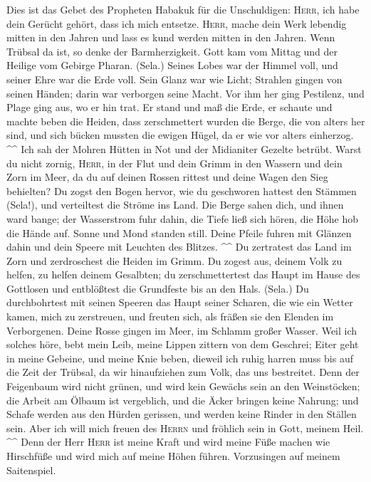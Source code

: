  Dies ist das Gebet des Propheten Habakuk für die
Unschuldigen:  \textsc{Herr}, ich habe dein Gerücht
gehört, dass ich mich entsetze. \textsc{Herr}, mache dein Werk lebendig
mitten in den Jahren und lass es kund werden mitten in den Jahren. Wenn
Trübsal da ist, so denke der Barmherzigkeit.  Gott kam vom
Mittag und der Heilige vom Gebirge Pharan. (Sela.) Seines Lobes war der
Himmel voll, und seiner Ehre war die Erde voll.  Sein
Glanz war wie Licht; Strahlen gingen von seinen Händen; darin war
verborgen seine Macht.  Vor ihm her ging Pestilenz, und
Plage ging aus, wo er hin trat.  Er stand und maß die
Erde, er schaute und machte beben die Heiden, dass zerschmettert wurden
die Berge, die von alters her sind, und sich bücken mussten die ewigen
Hügel, da er wie vor alters einherzog. \^{}\^{}  Ich sah
der Mohren Hütten in Not und der Midianiter Gezelte betrübt.
 Warst du nicht zornig, \textsc{Herr}, in der Flut und
dein Grimm in den Wassern und dein Zorn im Meer, da du auf deinen Rossen
rittest und deine Wagen den Sieg behielten?  Du zogst den
Bogen hervor, wie du geschworen hattest den Stämmen (Sela!), und
verteiltest die Ströme ins Land.  Die Berge sahen dich,
und ihnen ward bange; der Wasserstrom fuhr dahin, die Tiefe ließ sich
hören, die Höhe hob die Hände auf.  Sonne und Mond
standen still. Deine Pfeile fuhren mit Glänzen dahin und dein Speere mit
Leuchten des Blitzes. \^{}\^{}  Du zertratest das Land im
Zorn und zerdroschest die Heiden im Grimm.  Du zogest
aus, deinem Volk zu helfen, zu helfen deinem Gesalbten; du
zerschmettertest das Haupt im Hause des Gottlosen und entblößtest die
Grundfeste bis an den Hals. (Sela.)  Du durchbohrtest mit
seinen Speeren das Haupt seiner Scharen, die wie ein Wetter kamen, mich
zu zerstreuen, und freuten sich, als fräßen sie den Elenden im
Verborgenen.  Deine Rosse gingen im Meer, im Schlamm
großer Wasser.  Weil ich solches höre, bebt mein Leib,
meine Lippen zittern von dem Geschrei; Eiter geht in meine Gebeine, und
meine Knie beben, dieweil ich ruhig harren muss bis auf die Zeit der
Trübsal, da wir hinaufziehen zum Volk, das uns bestreitet.
 Denn der Feigenbaum wird nicht grünen, und wird kein
Gewächs sein an den Weinstöcken; die Arbeit am Ölbaum ist vergeblich,
und die Äcker bringen keine Nahrung; und Schafe werden aus den Hürden
gerissen, und werden keine Rinder in den Ställen sein. 
Aber ich will mich freuen des \textsc{Herrn} und fröhlich sein in Gott,
meinem Heil. \^{}\^{}  Denn der Herr \textsc{Herr} ist
meine Kraft und wird meine Füße machen wie Hirschfüße und wird mich auf
meine Höhen führen. Vorzusingen auf meinem Saitenspiel.
